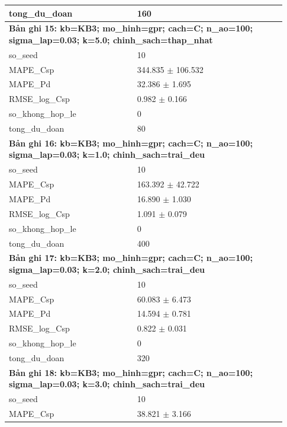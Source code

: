 \begin{longtable}{p{0.43\linewidth}p{0.50\linewidth}}
tong\_\allowbreak du\_\allowbreak doan & 160 \\
\midrule
\multicolumn{2}{p{0.95\linewidth}}{\textbf{Bản ghi 15: kb=KB3; mo\_hinh=gpr; cach=C; n\_ao=100; sigma\_lap=0.03; k=5.0; chinh\_sach=thap\_nhat}} \\
so\_\allowbreak seed & 10 \\
MAPE\_\allowbreak Csp & 344.835 $\pm$ 106.532 \\
MAPE\_\allowbreak Pd & 32.386 $\pm$ 1.695 \\
RMSE\_\allowbreak log\_\allowbreak Csp & 0.982 $\pm$ 0.166 \\
so\_\allowbreak khong\_\allowbreak hop\_\allowbreak le & 0 \\
tong\_\allowbreak du\_\allowbreak doan & 80 \\
\midrule
\multicolumn{2}{p{0.95\linewidth}}{\textbf{Bản ghi 16: kb=KB3; mo\_hinh=gpr; cach=C; n\_ao=100; sigma\_lap=0.03; k=1.0; chinh\_sach=trai\_deu}} \\
so\_\allowbreak seed & 10 \\
MAPE\_\allowbreak Csp & 163.392 $\pm$ 42.722 \\
MAPE\_\allowbreak Pd & 16.890 $\pm$ 1.030 \\
RMSE\_\allowbreak log\_\allowbreak Csp & 1.091 $\pm$ 0.079 \\
so\_\allowbreak khong\_\allowbreak hop\_\allowbreak le & 0 \\
tong\_\allowbreak du\_\allowbreak doan & 400 \\
\midrule
\multicolumn{2}{p{0.95\linewidth}}{\textbf{Bản ghi 17: kb=KB3; mo\_hinh=gpr; cach=C; n\_ao=100; sigma\_lap=0.03; k=2.0; chinh\_sach=trai\_deu}} \\
so\_\allowbreak seed & 10 \\
MAPE\_\allowbreak Csp & 60.083 $\pm$ 6.473 \\
MAPE\_\allowbreak Pd & 14.594 $\pm$ 0.781 \\
RMSE\_\allowbreak log\_\allowbreak Csp & 0.822 $\pm$ 0.031 \\
so\_\allowbreak khong\_\allowbreak hop\_\allowbreak le & 0 \\
tong\_\allowbreak du\_\allowbreak doan & 320 \\
\midrule
\multicolumn{2}{p{0.95\linewidth}}{\textbf{Bản ghi 18: kb=KB3; mo\_hinh=gpr; cach=C; n\_ao=100; sigma\_lap=0.03; k=3.0; chinh\_sach=trai\_deu}} \\
so\_\allowbreak seed & 10 \\
MAPE\_\allowbreak Csp & 38.821 $\pm$ 3.166 \\

\end{longtable}
